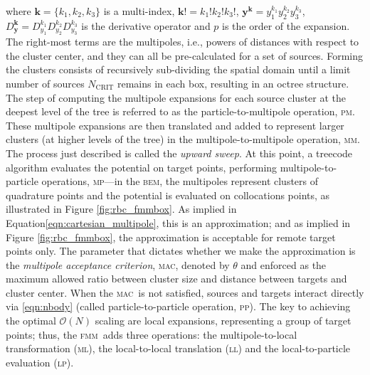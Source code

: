 \documentclass[final,leqno,]{siamltex1213}
\newcommand{\bem}{\textsc{bem}\xspace}
\newcommand{\fmm}{\textsc{fmm}\xspace}
\newcommand{\bigO}{\mathcal{O}}
\newcommand{\ptom}{\textsc{p}\texttwooldstyle\textsc{m}\xspace} %
\newcommand{\ltop}{\textsc{l}\texttwooldstyle\textsc{p}\xspace} %
\newcommand{\mtop}{\textsc{m}\texttwooldstyle\textsc{p}\xspace} %
\newcommand{\mtom}{\textsc{m}\texttwooldstyle\textsc{m}\xspace} %
\newcommand{\mtol}{\textsc{m}\texttwooldstyle\textsc{l}\xspace} %
\newcommand{\ltol}{\textsc{l}\texttwooldstyle\textsc{l}\xspace}  %
\newcommand{\ptop}{\textsc{p}\texttwooldstyle\textsc{p}\xspace} %
\newcommand{\ncrit}{N_{\text{CRIT}}}
\newcommand{\mac}{\textsc{mac}}
\newcommand{\vect}[1]{\mathbf{#1}}
\begin{document}
\noindent where $\vect{k}=\{k_1, k_2, k_3\}$ is a multi-index, $\vect{k}! = k_1!k_2!k_3!$, $\vect{y}^{\vect{k}} = y_1^{k_1}y_2^{k_2}y_3^{k_3}$, $D_{\vect{y}}^{\vect{k}} = D^{k_1}_{y_1}D^{k_2}_{y_2}D^{k_3}_{y_3}$ is the derivative operator and $p$ is the order of the expansion. The right-most terms are the multipoles, i.e., powers of distances with respect to the cluster center, and they can all be pre-calculated for a set of sources. Forming the clusters consists of recursively sub-dividing the spatial domain until a limit number of sources $\ncrit$ remains in each box, resulting in an octree structure. 
The step of computing the multipole expansions for each source cluster at the deepest level of the tree is referred to as the particle-to-multipole operation, {\ptom}. These multipole expansions are then translated and added to represent larger clusters (at higher levels of the tree) in the multipole-to-multipole operation, {\mtom}. The process just described is called the \emph{upward sweep}.
At this point, a treecode algorithm evaluates the potential on target points, performing  multipole-to-particle operations, {\mtop}---in the \bem, the multipoles represent clusters of quadrature points and the potential is evaluated on collocations points, as illustrated in Figure \ref{fig:rbc_fmmbox}. As implied in Equation\eqref{eqn:cartesian_multipole}, this is an approximation; and as implied in Figure \ref{fig:rbc_fmmbox}, the approximation is acceptable for remote target points only. The parameter that dictates whether we make the approximation is the \emph{multipole acceptance criterion}, \mac, denoted by $\theta$ and enforced as the maximum allowed ratio between cluster size and distance between targets and cluster center. When the \mac\ is not satisfied, sources and targets interact directly via \eqref{eqn:nbody} (called particle-to-particle operation, \ptop). The key to achieving the optimal $\bigO(N)$ scaling are local expansions, representing a group of target points; thus, the \fmm\ adds three operations: the multipole-to-local transformation (\mtol), the local-to-local translation (\ltol) and the local-to-particle evaluation (\ltop).
\end{document}
